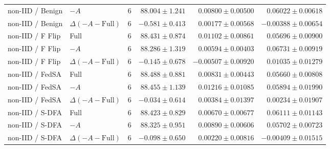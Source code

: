 \begin{table}[t]
\begin{tabular}{llrrrr}
non-IID / Benign & $-A$ & 6 & $88.004 \pm 1.241$ & $0.00800 \pm 0.00500$ & $0.06022 \pm 0.00618$ \\
non-IID / Benign & $\Delta(-A-\mathrm{Full})$ & 6 & $-0.581 \pm 0.413$ & $0.00177 \pm 0.00568$ & $-0.00388 \pm 0.00654$ \\
non-IID / F Flip & Full & 6 & $88.431 \pm 0.874$ & $0.01102 \pm 0.00861$ & $0.05696 \pm 0.00900$ \\
non-IID / F Flip & $-A$ & 6 & $88.286 \pm 1.319$ & $0.00594 \pm 0.00403$ & $0.06731 \pm 0.00919$ \\
non-IID / F Flip & $\Delta(-A-\mathrm{Full})$ & 6 & $-0.145 \pm 0.678$ & $-0.00507 \pm 0.00920$ & $0.01035 \pm 0.01279$ \\
non-IID / FedSA & Full & 6 & $88.488 \pm 0.881$ & $0.00831 \pm 0.00443$ & $0.05660 \pm 0.00808$ \\
non-IID / FedSA & $-A$ & 6 & $88.455 \pm 1.139$ & $0.01216 \pm 0.01085$ & $0.05894 \pm 0.01990$ \\
non-IID / FedSA & $\Delta(-A-\mathrm{Full})$ & 6 & $-0.034 \pm 0.614$ & $0.00384 \pm 0.01397$ & $0.00234 \pm 0.01907$ \\
non-IID / S-DFA & Full & 6 & $88.423 \pm 0.829$ & $0.00670 \pm 0.00677$ & $0.06111 \pm 0.01143$ \\
non-IID / S-DFA & $-A$ & 6 & $88.325 \pm 0.951$ & $0.00890 \pm 0.00606$ & $0.05702 \pm 0.00723$ \\
non-IID / S-DFA & $\Delta(-A-\mathrm{Full})$ & 6 & $-0.098 \pm 0.650$ & $0.00220 \pm 0.00816$ & $-0.00409 \pm 0.01515$ \\
\bottomrule
\end{tabular}
\end{table}

